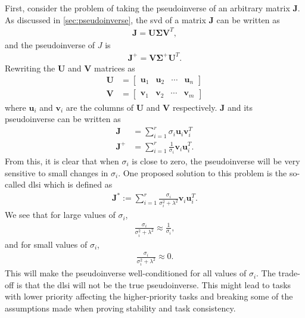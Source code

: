 First, consider the problem of taking the pseudoinverse of an arbitrary matrix $\bm{J}$.
As discussed in \autoref{sec:pseudoinverse}, the \gls{svd} of a matrix $\bm{J}$ can be
written as
\begin{align}
    \bm{J} = \bm{U} \bm{\Sigma} \bm{V}^T,
\end{align}
and the pseudoinverse of $J$ is
\begin{align}
    \bm{J}^+ = \bm{V} \bm{\Sigma}^+ \bm{U}^T.
\end{align}
Rewriting the $\bm{U}$ and $\bm{V}$ matrices as
\begin{subequations}
\begin{align}
    \bm{U} &= \begin{bmatrix} \bm{u}_1 & \bm{u}_2 & \cdots & \bm{u}_n \end{bmatrix} \\
    \bm{V} &= \begin{bmatrix} \bm{v}_1 & \bm{v}_2 & \cdots & \bm{v}_m \end{bmatrix}
\end{align}
\end{subequations}
where $\bm{u}_i$ and $\bm{v}_i$ are the columns of $\bm{U}$ and $\bm{V}$ respectively.
$\bm{J}$ and its pseudoinverse can be written as
\begin{subequations}
\begin{align}
    \bm{J} &= \sum_{i=1}^r \sigma_i \bm{u}_i \bm{v}_i^T \\
    \bm{J}^+ &= \sum_{i=1}^r \frac{1}{\sigma_i} \bm{v}_i \bm{u}_i^T.
\end{align}
\end{subequations}
From this, it is clear that when $\sigma_i$ is close to zero, the pseudoinverse
will be very sensitive to small changes in $\sigma_i$. One proposed solution to
this problem is the so-called \gls{dlsi} which is defined as
\begin{align}
    \bm{J}^* := \sum_{i=1}^r \frac{\sigma_i}{\sigma_i^2 + \lambda^2} \bm{v}_i \bm{u}_i^T.
\end{align}
We see that for large values of $\sigma_i$,
\begin{align}
    \frac{\sigma_i}{\sigma_i^2 + \lambda^2} \approx \frac{1}{\sigma_i},
\end{align}
and for small values of $\sigma_i$,
\begin{align}
    \frac{\sigma_i}{\sigma_i^2 + \lambda^2} \approx 0.
\end{align}
This will make the pseudoinverse well-conditioned for all values of $\sigma_i$.
The trade-off is that the \gls{dlsi} will not be the true pseudoinverse.
This might lead to tasks with lower priority affecting the higher-priority tasks and
breaking some of the assumptions made when proving stability and task consistency.

